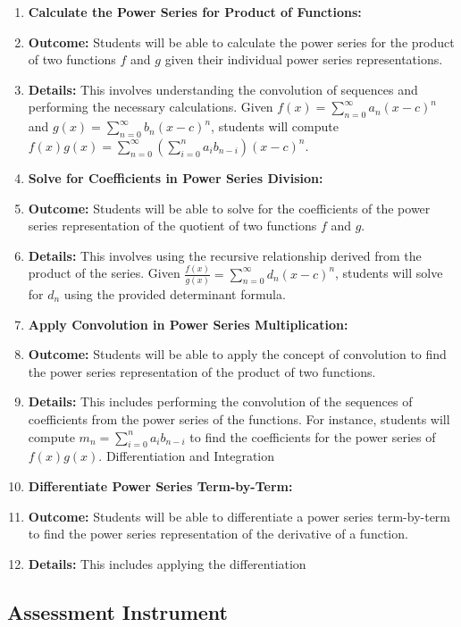 \begin{enumerate}
    \item \textbf{Calculate the Power Series for Product of Functions:}
    \item \textbf{Outcome:} Students will be able to calculate the power series for the product of two functions \( f \) and \( g \) given their individual power series representations.
    \item \textbf{Details:} This involves understanding the convolution of sequences and performing the necessary calculations. Given \( f(x) = \sum_{n=0}^\infty a_n (x - c)^n \) and \( g(x) = \sum_{n=0}^\infty b_n (x - c)^n \), students will compute \( f(x)g(x) = \sum_{n=0}^\infty \left( \sum_{i=0}^n a_i b_{n-i} \right) (x - c)^n \).
    \item \textbf{Solve for Coefficients in Power Series Division:}
    \item \textbf{Outcome:} Students will be able to solve for the coefficients of the power series representation of the quotient of two functions \( f \) and \( g \).
    \item \textbf{Details:} This involves using the recursive relationship derived from the product of the series. Given \( \frac{f(x)}{g(x)} = \sum_{n=0}^\infty d_n (x - c)^n \), students will solve for \( d_n \) using the provided determinant formula.
    \item \textbf{Apply Convolution in Power Series Multiplication:}
    \item \textbf{Outcome:} Students will be able to apply the concept of convolution to find the power series representation of the product of two functions.
    \item \textbf{Details:} This includes performing the convolution of the sequences of coefficients from the power series of the functions. For instance, students will compute \( m_n = \sum_{i=0}^n a_i b_{n-i} \) to find the coefficients for the power series of \( f(x)g(x) \). Differentiation and Integration
    \item \textbf{Differentiate Power Series Term-by-Term:}
    \item \textbf{Outcome:} Students will be able to differentiate a power series term-by-term to find the power series representation of the derivative of a function.
    \item \textbf{Details:} This includes applying the differentiation
\end{enumerate}

\subsection{Assessment Instrument}

